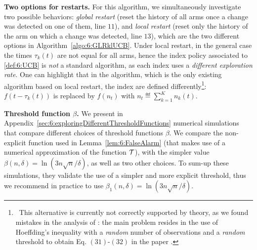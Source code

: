 \textbf{Two options for restarts.}
%
For this algorithm, we simultaneously investigate two possible behaviors:
\emph{global restart} (reset the history of all arms once a change was detected on one of them, line $11$), and \emph{local restart} (reset only the history of the arm on which a change was detected, line $13$), which are the two different options in Algorithm~\ref{algo:6:GLRklUCB}.
%
Under local restart, in the general case the times $\tau_k(t)$ are not equal for all arms, hence the index policy associated to \eqref{def:6:UCB} is \emph{not} a standard \UCB{} algorithm, as each index uses a \emph{different exploration rate}.
%
One can highlight that in the \CUSUMUCB{} algorithm, which is the only existing algorithm based on local restart, the \UCB{} index are defined differently\footnote{~This alternative is currently not correctly supported by theory, as we found mistakes in the analysis of \CUSUMUCB: the main problem resides in the use of Hoeffding's inequality with a \emph{random} number of observations and a \emph{random} threshold to obtain Eq. $(31)$-$(32)$ in the paper \cite{LiuLeeShroff17}.}:
$f(t-\tau_k(t))$ is replaced by $f(n_t)$ with $n_t \eqdef \sum_{k=1}^K n_k(t)$.


\textbf{Threshold function $\beta$.}
%
We present in Appendix~\ref{sec:6:exploringDifferentThresholdFunctions} numerical simulations that compare different choices of threshold functions $\beta$.
We compare the non-explicit function used in Lemma~\ref{lem:6:FalseAlarm} (that makes use of a numerical approximation of the function $\mathcal{T}$),
with the simpler value $\beta(n,\delta) = \ln(3n\sqrt{n}/\delta)$, as well as two other choices.
To sum-up these simulations, they validate the use of a simpler and more explicit threshold, thus we recommend in practice to use $\beta_1(n,\delta) = \ln(3n\sqrt{n}/\delta)$.



